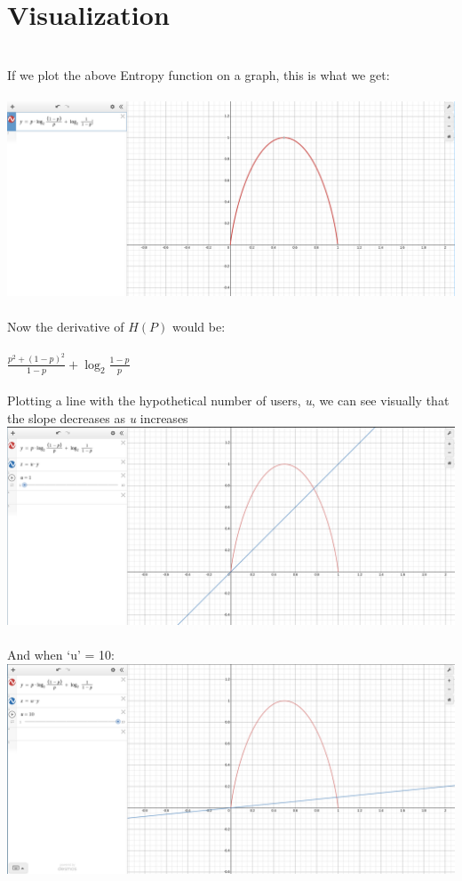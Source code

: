 \documentclass{article}
\begin{document}
\section{Visualization}
\\
If we plot the above Entropy function on a graph, this is what we get:\\
\\
\includegraphics[width=\textwidth]{Entropy1.png}\\
\\
Now the derivative of $H(P)$ would be:\\
\\
$\frac{p^2 + (1 - p)^2}{1 - p} + \log_2 \frac{1 - p}{p}$\\
\\
Plotting a line with the hypothetical number of users, \textit{u}, we can see visually that the slope decreases as \textit{u} increases\\
\includegraphics[width=\textwidth]{Entropy2.png}\\
\\
And when `u' = 10:\\
\includegraphics[width=\textwidth]{Entropy3.png}\\
\end{document}

